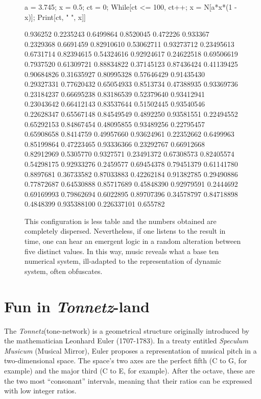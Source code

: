 \documentclass{article}
\newcommand{\Tonnetz}{\emph{Tonnetz}}
\begin{document}
\begin{figure}[h]
a = 3.745; x = 0.5; ct = 0;
While[ct <= 100, ct++; x = N[a*x*(1 - x)];
Print[ct, "  ", x]]

0.936252  0.2235243  0.6499864  0.8520045
0.472226  0.933367  0.2329368  0.6691459
0.82910610  0.53062711  0.93273712  0.23495613
0.6731714  0.82394615  0.54324616  0.92924617
0.24622518  0.69506619  0.7937520  0.61309721
0.88834822  0.37145123  0.87436424  0.41139425
0.90684826  0.31635927  0.80995328  0.57646429
0.91435430  0.29327331  0.77620432  0.65054933
0.8513734  0.47388935  0.93369736  0.23184237
0.66695238  0.83186539  0.52379640  0.93412941
0.23043642  0.66412143  0.83537644  0.51502445
0.93540546  0.22628347  0.65567148  0.84549549
0.4892250  0.93581551  0.22494552  0.65292153
0.84867454  0.48095855  0.93489256  0.22795457
0.65908658  0.8414759  0.49957660  0.93624961
0.22352662  0.6499963  0.85199864  0.47223465
0.93336366  0.23292767  0.66912668  0.82912969
0.5305770  0.9327571  0.23491372  0.67308573
0.82405574  0.54298175  0.92933276  0.2459577
0.69454378  0.79451379  0.61141780  0.8897681
0.36733582  0.87033883  0.42262184  0.91382785
0.29490886  0.77872687  0.64530888  0.85717689
0.45848390  0.92979591  0.2444692  0.69169993
0.79862694  0.6022895  0.89707396  0.34578797
0.84718898  0.4848399  0.935388100  0.226337101
0.655782
\caption{This configuration is less table and the numbers obtained are
completely dispersed.  Nevertheless, if one listens to the result in time,
one can hear an emergent logic in a random alteration between five distinct
values.  In this way, music reveals what a base ten numerical system,
ill-adapted to the representation of dynamic system, often obfuscates.}
\end{figure}
\section*{Fun in \Tonnetz-land}
The \Tonnetz (tone-network) is a geometrical structure originally
introduced by the mathematician Leonhard Euler (1707-1783). In a treaty
entitled \emph{Speculum Musicum} (Musical Mirror), Euler proposes a
representation of musical pitch in a two-dimensional space.  The space's two
axes are the perfect fifth (C to G, for example) and the major third (C to
E, for example).  After the octave, these are the two most ``consonant''
intervals, meaning that their ratios can be expressed with low integer
ratios.
\end{document}
